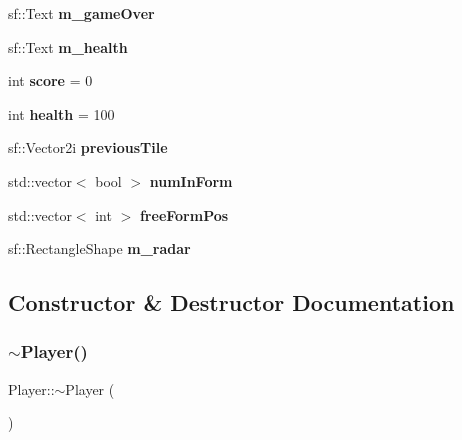\begin{DoxyCompactItemize}
\mbox{\label{class_player_a25c6d64fe2b6187b757712b76208f1e1}} 
sf\+::\+Text {\bfseries m\+\_\+game\+Over}
\item 
\mbox{\label{class_player_af526699fe84cfc5381940f5b76a264b7}} 
sf\+::\+Text {\bfseries m\+\_\+health}
\item 
\mbox{\label{class_player_ace6abae8d66534ad0a1fd6458f786a6e}} 
int {\bfseries score} = 0
\item 
\mbox{\label{class_player_aad33b52bfe73c4c978a3135172f286a0}} 
int {\bfseries health} = 100
\item 
\mbox{\label{class_player_a6bdcecc3d6ba47869296f24105a3c224}} 
sf\+::\+Vector2i {\bfseries previous\+Tile}
\item 
\mbox{\label{class_player_a7616de349ade92d40448e2c29b3564a8}} 
std\+::vector$<$ bool $>$ {\bfseries num\+In\+Form}
\item 
\mbox{\label{class_player_a25825edb64d9cc5ac3da3b78314be268}} 
std\+::vector$<$ int $>$ {\bfseries free\+Form\+Pos}
\item 
\mbox{\label{class_player_ac3ef394ba3cea77cb234349ed1fe1026}} 
sf\+::\+Rectangle\+Shape {\bfseries m\+\_\+radar}
\end{DoxyCompactItemize}


\subsection{Constructor \& Destructor Documentation}
\mbox{\label{class_player_a749d2c00e1fe0f5c2746f7505a58c062}} 
\subsubsection{\texorpdfstring{$\sim$Player()}{~Player()}}
{\footnotesize\ttfamily Player\+::$\sim$\+Player (\begin{DoxyParamCaption}{ }\end{DoxyParamCaption})}



